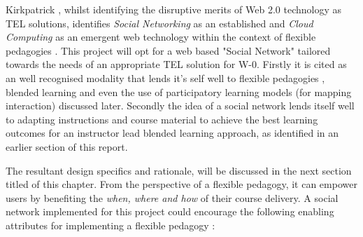 \newpage
Kirkpatrick , whilst identifying the disruptive merits of Web 2.0 technology as TEL solutions, identifies \textit{Social Networking} as an established and \textit{Cloud Computing} as an emergent web technology within the context of flexible pedagogies \cite{Burge2011}. This project will opt for a web based "Social Network" tailored towards the needs of an appropriate TEL  solution for W-0. Firstly it is cited as an well recognised modality that lends it's self well to flexible pedagogies \cite{Burge2011,Gordon2014}, blended learning and even the use of participatory learning models (for mapping interaction) \cite{Yager1990,Yager2004} discussed later. Secondly the idea of a social network lends itself well to adapting instructions and course material to achieve the best learning outcomes for an instructor lead blended learning approach, as identified in an earlier section of this report.

The resultant design specifics and rationale, will be discussed in the next section titled  of this chapter. From the perspective of a flexible pedagogy, it can empower users by benefiting the \textit{when, where and how}\cite{Gordon2014} of their course delivery. A social network implemented for this project could encourage the following enabling attributes for implementing a flexible pedagogy \cite{Burge2011}:

